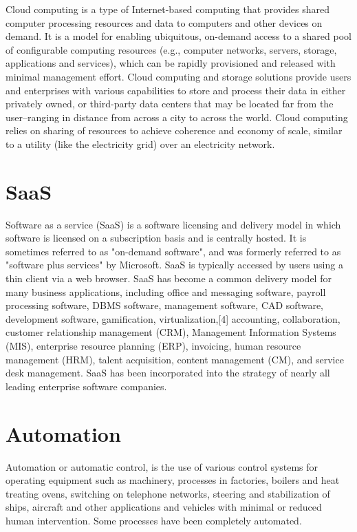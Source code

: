 Cloud computing is a type of Internet-based computing that provides shared
computer processing resources and data to computers and other devices on demand.
It is a model for enabling ubiquitous, on-demand access to a shared pool of
configurable computing resources (e.g., computer networks, servers, storage,
applications and services), which can be rapidly provisioned and released
with minimal management effort. Cloud computing and storage solutions provide
users and enterprises with various capabilities to store and process their data
in either privately owned, or third-party data centers that may be located
far from the user–ranging in distance from across a city to across the world.
Cloud computing relies on sharing of resources to achieve coherence and economy
of scale, similar to a utility (like the electricity grid) over an electricity
network.

\section{SaaS}
Software as a service (SaaS) is a software licensing and
delivery model in which software is licensed on a subscription basis and is
centrally hosted. It is sometimes referred to as "on-demand software",
and was formerly referred to as "software plus services" by Microsoft. SaaS
is typically accessed by users using a thin client via a web browser. SaaS has
become a common delivery model for many business applications, including office
and messaging software, payroll processing software, DBMS software, management
software, CAD software, development software, gamification, virtualization,[4]
accounting, collaboration, customer relationship management (CRM), Management
Information Systems (MIS), enterprise resource planning (ERP), invoicing, human
resource management (HRM), talent acquisition, content management (CM), and
service desk management. SaaS has been incorporated into the strategy of
nearly all leading enterprise software companies.

\section{Automation}
Automation or automatic control, is the use of various control systems for
operating equipment such as machinery, processes in factories, boilers and heat
treating ovens, switching on telephone networks, steering and stabilization of
ships, aircraft and other applications and vehicles with minimal or reduced
human intervention. Some processes have been completely automated.

